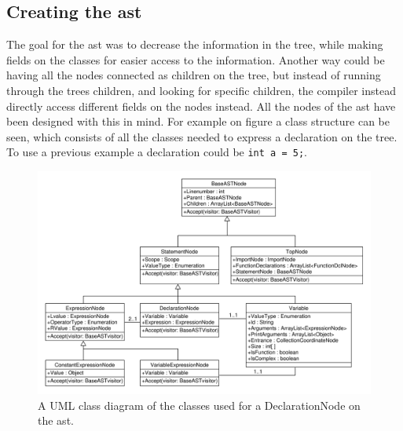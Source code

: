 \subsection{Creating the \acrshort{ast}}\label{CreatingAst}

The goal for the \acrshort{ast} was to decrease the information in the tree, while making fields on the classes for easier access to the information.
Another way could be having all the nodes connected as children on the tree, but instead of running through the trees children, and looking for specific children, the compiler instead directly access different fields on the nodes instead.
All the nodes of the \acrshort{ast} have been designed with this in mind.
For example on figure  a class structure can be seen, which consists of all the classes needed to express a declaration on the tree.
To use a previous example a declaration could be \texttt{int a = 5;}.

\begin{figure}[!ht]
\centering
 \includegraphics[width=1\textwidth]{figures/ClassDiagrams/ASTDeclarationNodeMoreInfo.pdf} %
\caption{A UML class diagram of the classes used for a DeclarationNode on the \acrshort{ast}.}\label{image:ASTDecl}
\vspace{-15pt}
\end{figure}

